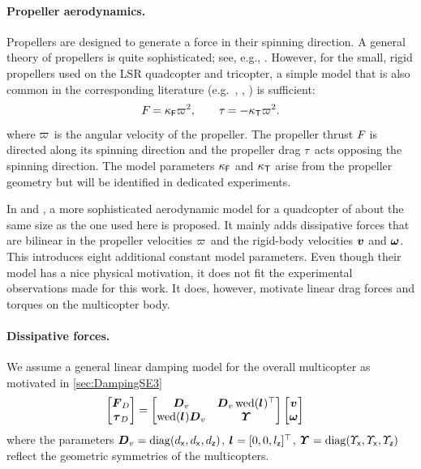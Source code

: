 \paragraph{Propeller aerodynamics.}
Propellers are designed to generate a force in their spinning direction.
A general theory of propellers is quite sophisticated; see, e.g., \cite{Johnson:HelicopterTheory}.
However, for the small, rigid propellers used on the LSR quadcopter and tricopter, a simple model that is also common in the corresponding literature (e.g.\ \cite{Mahony:Quadrotor2002}, \cite{MellingerIJRR12}, \cite{Fritsch:Diss}) is sufficient:
\begin{align}\label{eq:RealizationModelPropeller}
 F_{} = \kappa_{\mathsf{F}} \varpi_{}^2,
\qquad
 \tau_{} = -\kappa_{\mathsf{T}} \varpi_{}^2.
\end{align}
where $\varpi_{}$ is the angular velocity of the propeller.
The propeller thrust $F_{}$ is directed along its spinning direction and the propeller drag $\tau_{}$ acts opposing the spinning direction.
The model parameters $\kappa_{\mathsf{F}}$ and $\kappa_{\mathsf{T}}$ arise from the propeller geometry but will be identified in dedicated experiments.

In \cite{Bristeau:Propeller} and \cite{Martin:AccelerometerFeedback}, a more sophisticated aerodynamic model for a quadcopter of about the same size as the one used here is proposed.
It mainly adds dissipative forces that are bilinear in the propeller velocities $\varpi_{}$ and the rigid-body velocities $\boldsymbol{v}$ and $\boldsymbol{\omega}$.
This introduces eight additional constant model parameters.
Even though their model has a nice physical motivation, it does not fit the experimental observations made for this work.
It does, however, motivate linear drag forces and torques on the multicopter body.

\paragraph{Dissipative forces.}
We assume a general linear damping model for the overall multicopter as motivated in \autoref{sec:DampingSE3}
\begin{align}
 \begin{bmatrix} \tuple{\bodyForceSym}_D \\ \tuple{\bodyTorqueSym}_D \end{bmatrix}
 &= 
 \begin{bmatrix} \mat{D}_v & \mat{D}_v \wedOp(\bodyCOD{}{})^\top \\ \wedOp(\bodyCOD{}{}) \mat{D}_v & \bodyMOD{}{} \end{bmatrix}
 \begin{bmatrix} \v \\ \w \end{bmatrix}
\end{align}
where the parameters $\boldsymbol{D}_v = \operatorname{diag}(d_{\mathsf{x}}, d_{\mathsf{x}}, d_{\mathsf{z}})$, $\bodyCOD{}{}{} = [0,0,\lz]^\top$, $\bodyMOD{}{}{} = \diag(\sigx, \sigx, \sigz)$ reflect the geometric symmetries of the multicopters.



